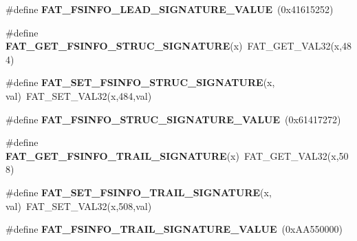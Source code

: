\begin{DoxyCompactItemize}
\item 
\mbox{\label{group__libfs__dosfs_ga80a4440d5e0e86b68c51e96f8c13e6e1}} 
\#define {\bfseries F\+A\+T\+\_\+\+F\+S\+I\+N\+F\+O\+\_\+\+L\+E\+A\+D\+\_\+\+S\+I\+G\+N\+A\+T\+U\+R\+E\+\_\+\+V\+A\+L\+UE}~(0x41615252)
\item 
\mbox{\label{group__libfs__dosfs_gaae2b3c3fb2c5b133e444ea4414aa84f7}} 
\#define {\bfseries F\+A\+T\+\_\+\+G\+E\+T\+\_\+\+F\+S\+I\+N\+F\+O\+\_\+\+S\+T\+R\+U\+C\+\_\+\+S\+I\+G\+N\+A\+T\+U\+RE}(x)~F\+A\+T\+\_\+\+G\+E\+T\+\_\+\+V\+A\+L32(x,484)
\item 
\mbox{\label{group__libfs__dosfs_gabc6b347870302168fd30f8bc0fdab332}} 
\#define {\bfseries F\+A\+T\+\_\+\+S\+E\+T\+\_\+\+F\+S\+I\+N\+F\+O\+\_\+\+S\+T\+R\+U\+C\+\_\+\+S\+I\+G\+N\+A\+T\+U\+RE}(x,  val)~F\+A\+T\+\_\+\+S\+E\+T\+\_\+\+V\+A\+L32(x,484,val)
\item 
\mbox{\label{group__libfs__dosfs_gaf1397978bc742ffe017ce142155c60c1}} 
\#define {\bfseries F\+A\+T\+\_\+\+F\+S\+I\+N\+F\+O\+\_\+\+S\+T\+R\+U\+C\+\_\+\+S\+I\+G\+N\+A\+T\+U\+R\+E\+\_\+\+V\+A\+L\+UE}~(0x61417272)
\item 
\mbox{\label{group__libfs__dosfs_gab33a45bc1083dc96564a0558f6c96bb6}} 
\#define {\bfseries F\+A\+T\+\_\+\+G\+E\+T\+\_\+\+F\+S\+I\+N\+F\+O\+\_\+\+T\+R\+A\+I\+L\+\_\+\+S\+I\+G\+N\+A\+T\+U\+RE}(x)~F\+A\+T\+\_\+\+G\+E\+T\+\_\+\+V\+A\+L32(x,508)
\item 
\mbox{\label{group__libfs__dosfs_ga15f7cbf49ae9763e32a23786146f165a}} 
\#define {\bfseries F\+A\+T\+\_\+\+S\+E\+T\+\_\+\+F\+S\+I\+N\+F\+O\+\_\+\+T\+R\+A\+I\+L\+\_\+\+S\+I\+G\+N\+A\+T\+U\+RE}(x,  val)~F\+A\+T\+\_\+\+S\+E\+T\+\_\+\+V\+A\+L32(x,508,val)
\item 
\mbox{\label{group__libfs__dosfs_ga9cabeeb58b89af0fb72ae41f486d2f0e}} 
\#define {\bfseries F\+A\+T\+\_\+\+F\+S\+I\+N\+F\+O\+\_\+\+T\+R\+A\+I\+L\+\_\+\+S\+I\+G\+N\+A\+T\+U\+R\+E\+\_\+\+V\+A\+L\+UE}~(0x\+A\+A550000)
\item 
\mbox{\label{group__libfs__dosfs_gaf1deb7e7ce57d374164aa914b46d4bac}} 

\end{DoxyCompactItemize}
